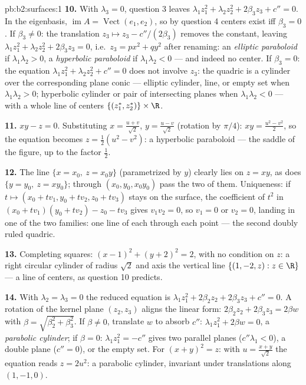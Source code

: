 \begin{solution}{pb:b2:surfaces:1}
\textbf{10.} With $\lambda_3 = 0$, question 3 leaves
$\lambda_1z_1^2 + \lambda_2z_2^2 + 2\beta_3z_3 + c'' = 0$. In
the eigenbasis, $\operatorname{im}A = \operatorname{Vect}(e_1,
e_2)$, so by question 4 centers exist iff $\beta_3 = 0$. If
$\beta_3 \neq 0$: the translation $z_3 \mapsto z_3 -
c''/(2\beta_3)$ removes the constant, leaving $\lambda_1z_1^2
+ \lambda_2z_2^2 + 2\beta_3z_3 = 0$, i.e.\ $z_3 = px^2 +
qy^2$ after renaming: an \emph{elliptic paraboloid} if
$\lambda_1\lambda_2 > 0$, a \emph{hyperbolic paraboloid} if
$\lambda_1\lambda_2 < 0$ --- and indeed no center. If
$\beta_3 = 0$: the equation $\lambda_1z_1^2 + \lambda_2z_2^2 +
c'' = 0$ does not involve $z_3$: the quadric is a cylinder
over the corresponding plane conic --- elliptic cylinder,
line, or empty set when $\lambda_1\lambda_2 > 0$; hyperbolic
cylinder or pair of intersecting planes when
$\lambda_1\lambda_2 < 0$ --- with a whole line of centers
$\{(z_1^*, z_2^*)\} \times \R$.

\textbf{11.} $xy - z = 0$. Substituting $x = \frac{u +
v}{\sqrt2}$, $y = \frac{u - v}{\sqrt2}$ (rotation by $\pi/4$):
$xy = \frac{u^2 - v^2}2$, so the equation becomes $z =
\frac12(u^2 - v^2)$: a hyperbolic paraboloid --- the saddle
of the figure, up to the factor $\frac12$.

\textbf{12.} The line $\{x = x_0,\ z = x_0y\}$ (parametrized
by $y$) clearly lies on $z = xy$, as does $\{y = y_0,\ z =
xy_0\}$; through $(x_0, y_0, x_0y_0)$ pass the two of them.
Uniqueness: if $t \mapsto (x_0 + tv_1, y_0 + tv_2, z_0 +
tv_3)$ stays on the surface, the coefficient of $t^2$ in $(x_0
+ tv_1)(y_0 + tv_2) - z_0 - tv_3$ gives $v_1v_2 = 0$, so
$v_1 = 0$ or $v_2 = 0$, landing in one of the two families:
one line of each through each point --- the second doubly
ruled quadric.

\textbf{13.} Completing squares: $(x - 1)^2 + (y + 2)^2 = 2$,
with no condition on $z$: a right circular cylinder of radius
$\sqrt2$ and axis the vertical line $\{(1, -2, z) : z \in
\R\}$ --- a line of centers, as question 10 predicts.

\textbf{14.} With $\lambda_2 = \lambda_3 = 0$ the reduced
equation is $\lambda_1z_1^2 + 2\beta_2z_2 + 2\beta_3z_3 + c''
= 0$. A rotation of the kernel plane $(z_2, z_3)$ aligns the
linear form: $2\beta_2z_2 + 2\beta_3z_3 = 2\beta w$ with
$\beta = \sqrt{\beta_2^2 + \beta_3^2}$. If $\beta \neq 0$,
translate $w$ to absorb $c''$: $\lambda_1z_1^2 + 2\beta w =
0$, a \emph{parabolic cylinder}; if $\beta = 0$:
$\lambda_1z_1^2 = -c''$ gives two parallel planes ($c''
\lambda_1 < 0$), a double plane ($c'' = 0$), or the empty
set. For $(x + y)^2 = z$: with $u = \frac{x + y}{\sqrt2}$ the
equation reads $z = 2u^2$: a parabolic cylinder, invariant
under translations along $(1, -1, 0)$.


\end{solution}

